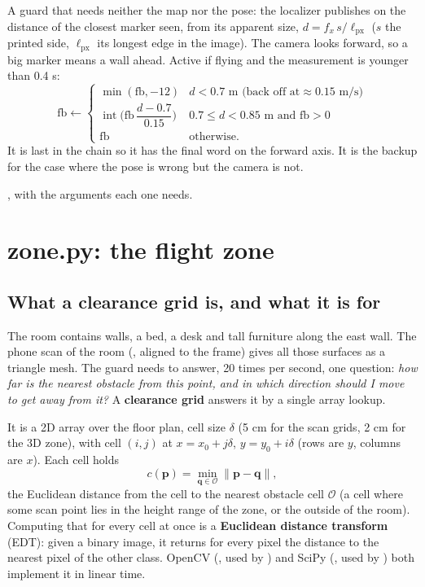A guard that needs neither the map nor the pose: the localizer publishes on  the
distance of the closest marker seen, from its apparent size, $d = f_x\,s/\ell_{\text{px}}$ ($s$ the printed side,
$\ell_{\text{px}}$ its longest edge in the image). The camera looks forward, so a big marker means a wall ahead.
Active if flying and the measurement is younger than 0.4 s:
$$
\text{fb} \leftarrow
\begin{cases}
\min(\text{fb}, -12) & d < 0.7\text{ m (back off at}\approx 0.15\text{ m/s)}\\
\operatorname{int}\Big(\text{fb}\,\dfrac{d-0.7}{0.15}\Big) & 0.7 \le d < 0.85\text{ m and fb}>0\\
\text{fb} & \text{otherwise.}
\end{cases}
$$
It is last in the chain so it has the final word on the forward axis. It is the backup for the case where the
pose is wrong but the camera is not.

, with the arguments each one needs.

\section{zone.py: the flight zone}
\label{sec:zonepy}

\subsection{What a clearance grid is, and what it is for}

The room contains walls, a bed, a desk and tall furniture along the east wall. The phone scan of the room
(, aligned to the  frame) gives all those surfaces as a triangle mesh.
The guard needs to answer, 20 times per second, one question: \emph{how far is the nearest obstacle from this
point, and in which direction should I move to get away from it?} A \textbf{clearance grid} answers it by a single
array lookup.

It is a 2D array over the floor plan, cell size $\delta$ (5 cm for the scan grids, 2 cm for the 3D zone), with
cell $(i,j)$ at $x = x_0 + j\delta$, $y = y_0 + i\delta$ (rows are $y$, columns are $x$). Each cell holds
$$
c(\bm p) = \min_{\bm q \in \mathcal O} \lVert \bm p - \bm q \rVert ,
$$
the Euclidean distance from the cell to the nearest obstacle cell $\mathcal O$ (a cell where some scan point lies
in the height range of the zone, or the outside of the room). Computing that for every cell at once is a
\textbf{Euclidean distance transform} (EDT): given a binary image, it returns for every pixel the distance to the
nearest pixel of the other class. OpenCV (, used by ) and
SciPy (, used by ) both implement it in linear time.

